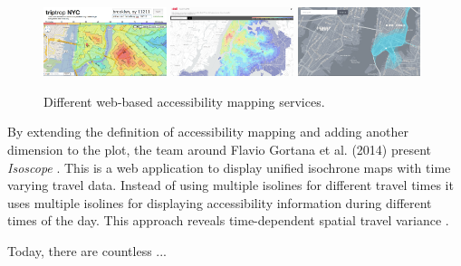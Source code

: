     \begin{figure}[t]
      {\includegraphics[width=0.32\textwidth]{./img/overv-ttnyc.png}}
      \hfill
      {\includegraphics[width=0.32\textwidth]{./img/overv-trnyc.png}}
      \hfill
      {\includegraphics[width=0.32\textwidth]{./img/overv-isosc.png}}
      \caption{Different web-based accessibility mapping services.}
      \label{fig:overv:4}
    \end{figure}

    By extending the definition of accessibility mapping and adding another
    dimension to the plot, the team around Flavio Gortana et al. (2014) present
    \textit{Isoscope} \cite{Isoscope}. This is a web application to display
    unified isochrone maps with time varying travel data. Instead of using
    multiple isolines for different travel times it uses multiple isolines for
    displaying accessibility information during different times of the day.
    This approach reveals time-dependent spatial travel variance
    \cite{gortanaisoscope}.\par

    Today, there are countless ...


